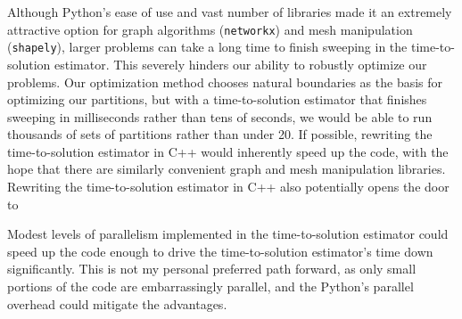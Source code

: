 Although Python's ease of use and vast number of libraries made it an extremely attractive option for graph algorithms ({\tt networkx}) and mesh manipulation ({\tt shapely}), larger problems can take a long time to finish sweeping in the time-to-solution estimator.
This severely hinders our ability to robustly optimize our problems.
Our optimization method chooses natural boundaries as the basis for optimizing our partitions, but with a time-to-solution estimator that finishes sweeping in milliseconds rather than tens of seconds, we would be able to run thousands of sets of partitions rather than under 20. 
If possible, rewriting the time-to-solution estimator in C++ would inherently speed up the code, with the hope that there are similarly convenient graph and mesh manipulation libraries. 
Rewriting the time-to-solution estimator in C++ also potentially opens the door to 

Modest levels of parallelism implemented in the time-to-solution estimator could speed up the code enough to drive the time-to-solution estimator's time down significantly.
This is not my personal preferred path forward, as only small portions of the code are embarrassingly parallel, and the Python's parallel overhead could mitigate the advantages. 